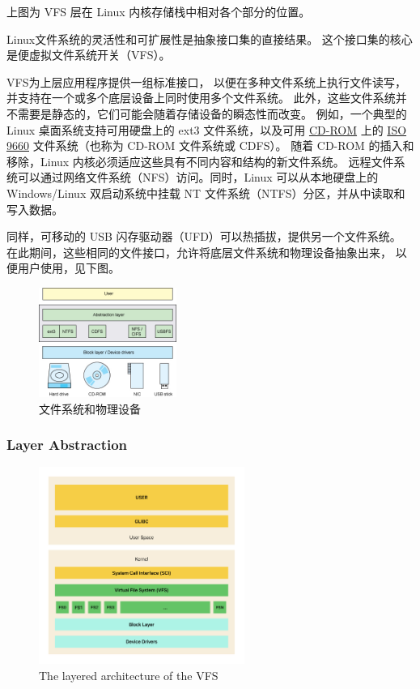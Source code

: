 \documentclass[UTF8,a4paper]{ctexart}
\begin{document}
上图为 VFS 层在 Linux 内核存储栈中相对各个部分的位置。

Linux文件系统的灵活性和可扩展性是抽象接口集的直接结果。
这个接口集的核心是便虚拟文件系统开关（VFS）。

VFS为上层应用程序提供一组标准接口，
以便在多种文件系统上执行文件读写，
并支持在一个或多个底层设备上同时使用多个文件系统。
此外，这些文件系统并不需要是静态的，它们可能会随着存储设备的瞬态性而改变。
例如，一个典型的
Linux 桌面系统支持可用硬盘上的 ext3 文件系统，以及可用
\href{https://en.wikipedia.org/wiki/CD-ROM}{CD-ROM} 上的
\href{https://en.wikipedia.org/wiki/ISO_9660}{ISO 9660} 
文件系统（也称为
CD-ROM 文件系统或 CDFS）。
随着 CD-ROM 的插入和移除，Linux
内核必须适应这些具有不同内容和结构的新文件系统。
远程文件系统可以通过网络文件系统（NFS）访问。同时，Linux
可以从本地硬盘上的 Windows/Linux 双启动系统中挂载 NT
文件系统（NTFS）分区，并从中读取和写入数据。

同样，可移动的 USB
闪存驱动器（UFD）可以热插拔，提供另一个文件系统。
在此期间，这些相同的文件接口，允许将底层文件系统和物理设备抽象出来，
以便用户使用，见下图。

\begin{figure}[H]
    \centering
    \includegraphics[width=0.4\textwidth]{figure1.jpg}
    \caption{文件系统和物理设备}
\end{figure}

\subsubsection{Layer Abstraction}

\begin{figure}[H]
    \centering
    \includegraphics[width=0.6\textwidth]{The layered architecture of the VFS.png}
    \caption{The layered architecture of the VFS}
\end{figure}
\end{document}
